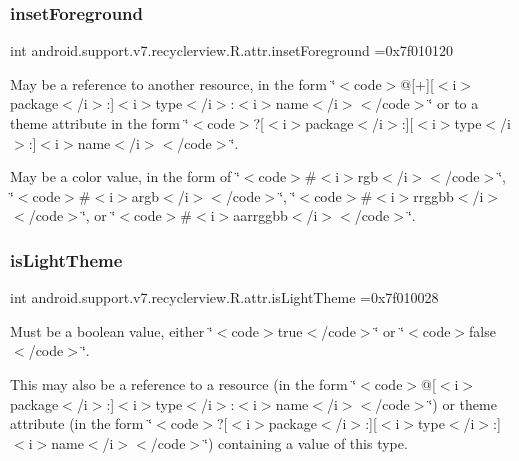 \subsubsection{\texorpdfstring{inset\+Foreground}{insetForeground}}
{\footnotesize\ttfamily int android.\+support.\+v7.\+recyclerview.\+R.\+attr.\+inset\+Foreground =0x7f010120\hspace{0.3cm}{\ttfamily [static]}}

May be a reference to another resource, in the form \char`\"{}$<$code$>$@\mbox{[}+\mbox{]}\mbox{[}$<$i$>$package$<$/i$>$\+:\mbox{]}$<$i$>$type$<$/i$>$\+:$<$i$>$name$<$/i$>$$<$/code$>$\char`\"{} or to a theme attribute in the form \char`\"{}$<$code$>$?\mbox{[}$<$i$>$package$<$/i$>$\+:\mbox{]}\mbox{[}$<$i$>$type$<$/i$>$\+:\mbox{]}$<$i$>$name$<$/i$>$$<$/code$>$\char`\"{}. 

May be a color value, in the form of \char`\"{}$<$code$>$\#$<$i$>$rgb$<$/i$>$$<$/code$>$\char`\"{}, \char`\"{}$<$code$>$\#$<$i$>$argb$<$/i$>$$<$/code$>$\char`\"{}, \char`\"{}$<$code$>$\#$<$i$>$rrggbb$<$/i$>$$<$/code$>$\char`\"{}, or \char`\"{}$<$code$>$\#$<$i$>$aarrggbb$<$/i$>$$<$/code$>$\char`\"{}. \mbox{\label{classandroid_1_1support_1_1v7_1_1recyclerview_1_1R_1_1attr_aca9a12a32f37685e9208da7973ab6d16}} 
\subsubsection{\texorpdfstring{is\+Light\+Theme}{isLightTheme}}
{\footnotesize\ttfamily int android.\+support.\+v7.\+recyclerview.\+R.\+attr.\+is\+Light\+Theme =0x7f010028\hspace{0.3cm}{\ttfamily [static]}}

Must be a boolean value, either \char`\"{}$<$code$>$true$<$/code$>$\char`\"{} or \char`\"{}$<$code$>$false$<$/code$>$\char`\"{}. 

This may also be a reference to a resource (in the form \char`\"{}$<$code$>$@\mbox{[}$<$i$>$package$<$/i$>$\+:\mbox{]}$<$i$>$type$<$/i$>$\+:$<$i$>$name$<$/i$>$$<$/code$>$\char`\"{}) or theme attribute (in the form \char`\"{}$<$code$>$?\mbox{[}$<$i$>$package$<$/i$>$\+:\mbox{]}\mbox{[}$<$i$>$type$<$/i$>$\+:\mbox{]}$<$i$>$name$<$/i$>$$<$/code$>$\char`\"{}) containing a value of this type. \mbox{\label{classandroid_1_1support_1_1v7_1_1recyclerview_1_1R_1_1attr_aa440cb64557c5ddd5389d0e485f7b0f2}} 
